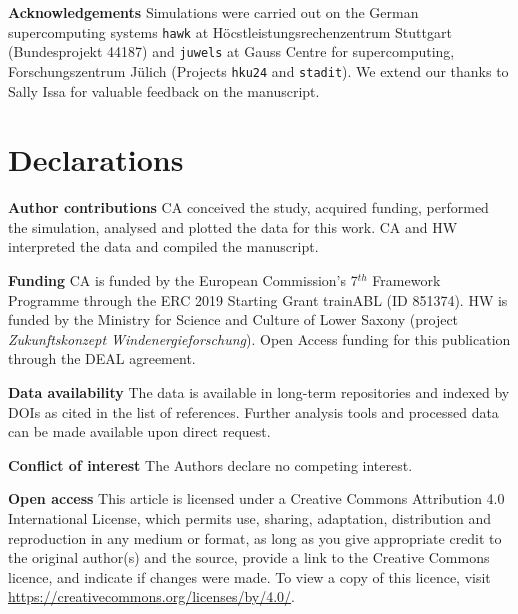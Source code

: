 \documentclass[smallcondensed,final]{svjour3}
\begin{document}
\vspace{1em}
\noindent\textbf{Acknowledgements} Simulations were carried out on the German supercomputing systems 
\texttt{hawk} at H\"ocstleistungsrechenzentrum Stuttgart (Bundesprojekt 44187) and \texttt{juwels} at Gauss Centre for supercomputing, 
For\-schungs\-zen\-trum J\"ulich (Projects \texttt{hku24} and \texttt{stadit}). 
We extend our thanks to Sally Issa for valuable feedback on the manuscript. 



\section*{Declarations} 

\noindent\textbf{Author contributions} CA conceived the study, acquired funding, performed the simulation, analysed and plotted the data for this work. CA and HW interpreted the data and compiled the manuscript. 
\vspace{1em} 

\noindent\textbf{Funding} CA is funded by the European Commission's 7$^{th}$ Framework Programme through 
the ERC 2019 Starting Grant trainABL (ID 851374). HW is funded by the Ministry for Science and Culture of 
Lower Saxony (project \emph{Zukunftskonzept Windenergieforschung}). Open Access funding for this publication through the DEAL agreement. 
\vspace{1em}

\noindent\textbf{Data availability} The data is available in long-term repositories and indexed by DOIs as cited in the list of references. Further analysis tools and processed data can be made available upon direct request. \vspace{1em}

\noindent\textbf{Conflict of interest} The Authors declare no competing interest.
\vspace{1em}

\noindent\textbf{Open access} This article is licensed under a Creative Commons Attribution 4.0 International License, which permits use, sharing, adaptation, distribution and reproduction in any medium or format, as long as you give appropriate credit to the original author(s) and the source, provide a link to the Creative Commons licence, and indicate if changes were made.  To view a copy of this licence, visit \href{http://creativecommons.org/licenses/by/4.0/}{https://creativecommons.org/licenses/by/4.0/}.
\end{document}
